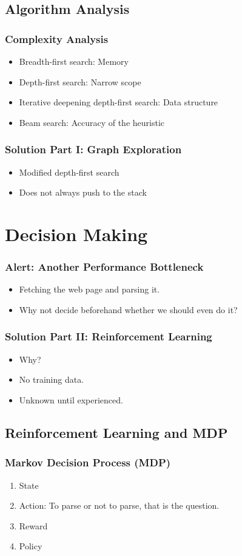 \documentclass{beamer}
\begin{document}
\subsection{Algorithm Analysis}
\begin{frame}
\frametitle{Complexity Analysis}
\begin{itemize}
\item Breadth-first search: Memory
\item Depth-first search: Narrow scope
\item Iterative deepening depth-first search: Data structure
\item Beam search: Accuracy of the heuristic
\end{itemize}
\end{frame}

\begin{frame}
\frametitle{Solution Part I: Graph Exploration}
\begin{itemize}
\item Modified depth-first search
\item Does not always push to the stack
\end{itemize}
\end{frame}

\section{Decision Making}
\begin{frame}
\frametitle{Alert: Another Performance Bottleneck}
\begin{itemize}
\item Fetching the web page and parsing it.
\item Why not decide beforehand whether we should even do it?
\end{itemize}
\end{frame}

\begin{frame}
\frametitle{Solution Part II: Reinforcement Learning}
\begin{itemize}
\item Why?
\item No training data.
\item Unknown until experienced.
\end{itemize}
\end{frame}

\subsection{Reinforcement Learning and MDP}
\begin{frame}
\frametitle{Markov Decision Process (MDP)}
\begin{enumerate}
\item State
\item Action: To parse or not to parse, that is the question.
\item Reward
\item Policy
\end{enumerate}
\end{frame}
\end{document}
